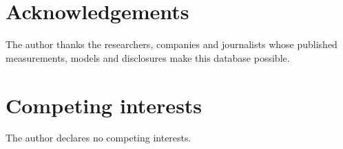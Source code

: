 \documentclass[11pt]{article}
\begin{document}
\section*{Acknowledgements}
The author thanks the researchers, companies and journalists whose published measurements, models and disclosures make this database possible.

\section*{Competing interests}
The author declares no competing interests.



\end{document}
